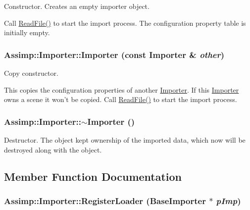 Constructor. Creates an empty importer object.

Call \hyperlink{class_assimp_1_1_importer_174418ab41d5b8bc51a044895cb991e5}{ReadFile()} to start the import process. The configuration property table is initially empty. \hypertarget{class_assimp_1_1_importer_69743664b5a7a8c195be48265144317b}{
\subsubsection[Importer]{\setlength{\rightskip}{0pt plus 5cm}Assimp::Importer::Importer (const {\bf Importer} \& {\em other})}}
\label{class_assimp_1_1_importer_69743664b5a7a8c195be48265144317b}


Copy constructor.

This copies the configuration properties of another \hyperlink{class_assimp_1_1_importer}{Importer}. If this \hyperlink{class_assimp_1_1_importer}{Importer} owns a scene it won't be copied. Call \hyperlink{class_assimp_1_1_importer_174418ab41d5b8bc51a044895cb991e5}{ReadFile()} to start the import process. \hypertarget{class_assimp_1_1_importer_3d65af5286ba22f46220a72a6eb2a1c9}{
\subsubsection[$\sim$Importer]{\setlength{\rightskip}{0pt plus 5cm}Assimp::Importer::$\sim$Importer ()}}
\label{class_assimp_1_1_importer_3d65af5286ba22f46220a72a6eb2a1c9}


Destructor. The object kept ownership of the imported data, which now will be destroyed along with the object. 

\subsection{Member Function Documentation}
\hypertarget{class_assimp_1_1_importer_3846294ffe76d91a1d3096d22d7c6b7d}{
\subsubsection[RegisterLoader]{ Assimp::Importer::RegisterLoader (BaseImporter $\ast$ {\em pImp})}}
\label{class_assimp_1_1_importer_3846294ffe76d91a1d3096d22d7c6b7d}


